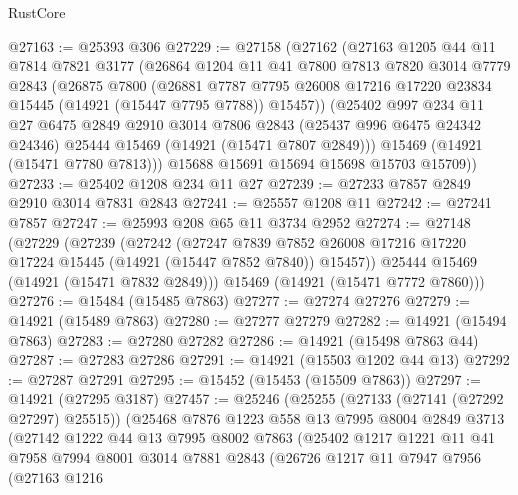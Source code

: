 \begin{lexlean}{RustCore}
\begin{coremodule}
@27163 := @25393 @306
@27229 := @27158
    (@27162
      (@27163
        @1205
        @44
        @11
        @7814
        @7821
        @3177
        (@26864
          @1204
          @11
          @41
          @7800
          @7813
          @7820
          @3014
          @7779
          @2843
          (@26875
            @7800
            (@26881
              @7787
              @7795
              @26008
              @17216
              @17220
              @23834
              @15445
              (@14921 (@15447 @7795 @7788))
              @15457))
          (@25402
            @997
            @234
            @11
            @27
            @6475
            @2849
            @2910
            @3014
            @7806
            @2843
            (@25437 @996 @6475 @24342 @24346)
            @25444
            @15469
            (@14921 (@15471 @7807 @2849)))
          @15469
          (@14921 (@15471 @7780 @7813)))
        @15688
        @15691
        @15694
        @15698
        @15703
        @15709))
@27233 := @25402 @1208 @234 @11 @27
@27239 := @27233 @7857 @2849 @2910 @3014 @7831 @2843
@27241 := @25557 @1208 @11
@27242 := @27241 @7857
@27247 := @25993 @208 @65 @11 @3734 @2952
@27274 := @27148
    (@27229
      (@27239
        (@27242
          (@27247
            @7839
            @7852
            @26008
            @17216
            @17220
            @17224
            @15445
            (@14921 (@15447 @7852 @7840))
            @15457))
        @25444
        @15469
        (@14921 (@15471 @7832 @2849)))
      @15469
      (@14921 (@15471 @7772 @7860)))
@27276 := @15484 (@15485 @7863)
@27277 := @27274 @27276
@27279 := @14921 (@15489 @7863)
@27280 := @27277 @27279
@27282 := @14921 (@15494 @7863)
@27283 := @27280 @27282
@27286 := @14921 (@15498 @7863 @44)
@27287 := @27283 @27286
@27291 := @14921 (@15503 @1202 @44 @13)
@27292 := @27287 @27291
@27295 := @15452 (@15453 (@15509 @7863))
@27297 := @14921 (@27295 @3187)
@27457 := @25246
    (@25255
      (@27133 (@27141 (@27292 @27297) @25515))
      (@25468
        @7876
        @1223
        @558
        @13
        @7995
        @8004
        @2849
        @3713
        (@27142
          @1222
          @44
          @13
          @7995
          @8002
          @7863
          (@25402
            @1217
            @1221
            @11
            @41
            @7958
            @7994
            @8001
            @3014
            @7881
            @2843
            (@26726
              @1217
              @11
              @7947
              @7956
              (@27163
                @1216

\end{coremodule}
\end{lexlean}
